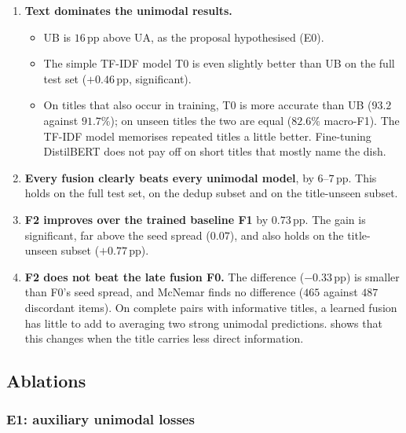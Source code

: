 \begin{enumerate}
  \item \textbf{Text dominates the unimodal results.}
        \begin{itemize}
          \item UB is $16$\,pp above UA, as the proposal hypothesised (E0).
          \item The simple TF-IDF model T0 is even slightly better than UB on the full test set ($+0.46$\,pp,
                significant).
          \item On titles that also occur in training, T0 is more accurate than UB ($93.2$ against $91.7\%$);
                on unseen titles the two are equal ($82.6\%$ macro-F1). The TF-IDF model memorises repeated
                titles a little better. Fine-tuning DistilBERT does not pay off on short titles that mostly name
                the dish.
        \end{itemize}
  \item \textbf{Every fusion clearly beats every unimodal model}, by $6$--$7$\,pp. This holds on the full test set,
        on the dedup subset and on the title-unseen subset.
  \item \textbf{F2 improves over the trained baseline F1} by $0.73$\,pp. The gain is significant, far above the
        seed spread ($0.07$), and also holds on the title-unseen subset ($+0.77$\,pp).
  \item \textbf{F2 does not beat the late fusion F0.} The difference ($-0.33$\,pp) is smaller than F0's seed spread,
        and McNemar finds no difference ($465$ against $487$ discordant items). On complete pairs with informative
        titles, a learned fusion has little to add to averaging two strong unimodal predictions.
         shows that this changes when the title carries less direct information.
\end{enumerate}

\subsection{Ablations}
\label{sec:ablation-results}

\subsubsection{E1: auxiliary unimodal losses}

